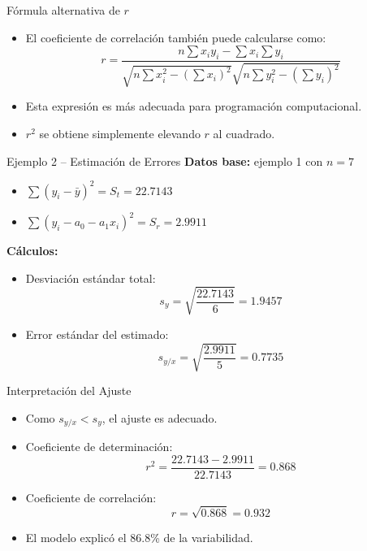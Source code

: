 \documentclass[main.tex]{subfiles}
\begin{document}
\begin{frame}{Fórmula alternativa de \(r\)}
  \begin{itemize}
    \item El coeficiente de correlación también puede calcularse como:
    \[
    r = \frac{n\sum x_i y_i - \sum x_i \sum y_i}
             {\sqrt{n \sum x_i^2 - (\sum x_i)^2} \sqrt{n \sum y_i^2 - (\sum y_i)^2}}
    \]
    \item Esta expresión es más adecuada para programación computacional.
    \item \(r^2\) se obtiene simplemente elevando \(r\) al cuadrado.
  \end{itemize}
\end{frame}

\begin{frame}{Ejemplo 2 – Estimación de Errores}
  \textbf{Datos base:} ejemplo 1 con \( n = 7 \)
  \begin{itemize}
    \item \(\sum (y_i - \bar{y})^2 = S_t = 22.7143\)
    \item \(\sum (y_i - a_0 - a_1x_i)^2 = S_r = 2.9911\)
  \end{itemize}
  \textbf{Cálculos:}
  \begin{itemize}
    \item Desviación estándar total:
    \[
      s_y = \sqrt{\frac{22.7143}{6}} = 1.9457
    \]
    \item Error estándar del estimado:
    \[
      s_{y/x} = \sqrt{\frac{2.9911}{5}} = 0.7735
    \]
  \end{itemize}
\end{frame}

\begin{frame}{Interpretación del Ajuste}
  \begin{itemize}
    \item Como \( s_{y/x} < s_y \), el ajuste es adecuado.
    \item Coeficiente de determinación:
    \[
      r^2 = \frac{22.7143 - 2.9911}{22.7143} = 0.868
    \]
    \item Coeficiente de correlación:
    \[
      r = \sqrt{0.868} = 0.932
    \]
    \item El modelo explicó el 86.8\% de la variabilidad.
  \end{itemize}
\end{frame}
\end{document}
